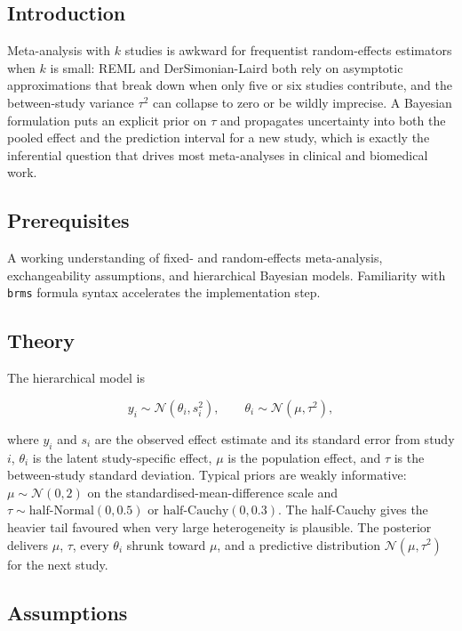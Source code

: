 \documentclass[
]{article}
\author{}
\date{\vspace{-2.5em}}
\begin{document}
\subsection{Introduction}\label{introduction}

Meta-analysis with \(k\) studies is awkward for frequentist
random-effects estimators when \(k\) is small: REML and
DerSimonian-Laird both rely on asymptotic approximations that break down
when only five or six studies contribute, and the between-study variance
\(\tau^2\) can collapse to zero or be wildly imprecise. A Bayesian
formulation puts an explicit prior on \(\tau\) and propagates
uncertainty into both the pooled effect and the prediction interval for
a new study, which is exactly the inferential question that drives most
meta-analyses in clinical and biomedical work.

\subsection{Prerequisites}\label{prerequisites}

A working understanding of fixed- and random-effects meta-analysis,
exchangeability assumptions, and hierarchical Bayesian models.
Familiarity with \texttt{brms} formula syntax accelerates the
implementation step.

\subsection{Theory}\label{theory}

The hierarchical model is

\[y_i \sim \mathcal N(\theta_i, s_i^2), \qquad \theta_i \sim \mathcal N(\mu, \tau^2),\]

where \(y_i\) and \(s_i\) are the observed effect estimate and its
standard error from study \(i\), \(\theta_i\) is the latent
study-specific effect, \(\mu\) is the population effect, and \(\tau\) is
the between-study standard deviation. Typical priors are weakly
informative: \(\mu \sim \mathcal N(0, 2)\) on the
standardised-mean-difference scale and
\(\tau \sim \mathrm{half\text{-}Normal}(0, 0.5)\) or
\(\mathrm{half\text{-}Cauchy}(0, 0.3)\). The half-Cauchy gives the
heavier tail favoured when very large heterogeneity is plausible. The
posterior delivers \(\mu\), \(\tau\), every \(\theta_i\) shrunk toward
\(\mu\), and a predictive distribution \(\mathcal N(\mu, \tau^2)\) for
the next study.

\subsection{Assumptions}\label{assumptions}
\end{document}
